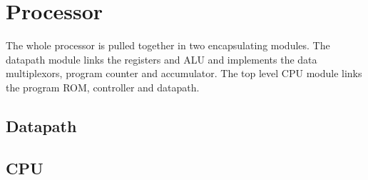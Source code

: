 
\section{Processor}

The whole processor is pulled together in two encapsulating modules. 
The datapath module links the registers and ALU and implements the data multiplexors, program counter and accumulator.
The top level CPU module links the program ROM, controller and datapath. 

\subsection{Datapath}

\subsection{CPU}



